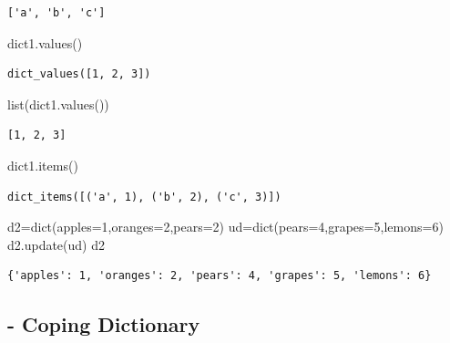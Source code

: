 \documentclass[
  letterpaper,
  DIV=11,
  numbers=noendperiod]{scrreprt}
\newenvironment{Shaded}{\begin{snugshade}}{\end{snugshade}}
\newcommand{\BuiltInTok}[1]{\textcolor[rgb]{0.00,0.23,0.31}{#1}}
\newcommand{\DecValTok}[1]{\textcolor[rgb]{0.68,0.00,0.00}{#1}}
\newcommand{\NormalTok}[1]{\textcolor[rgb]{0.00,0.23,0.31}{#1}}
\newcommand{\OperatorTok}[1]{\textcolor[rgb]{0.37,0.37,0.37}{#1}}
\begin{document}
\begin{verbatim}
['a', 'b', 'c']
\end{verbatim}

\begin{Shaded}
\begin{Highlighting}[]
\NormalTok{dict1.values()}
\end{Highlighting}
\end{Shaded}

\begin{verbatim}
dict_values([1, 2, 3])
\end{verbatim}

\begin{Shaded}
\begin{Highlighting}[]
\BuiltInTok{list}\NormalTok{(dict1.values())}
\end{Highlighting}
\end{Shaded}

\begin{verbatim}
[1, 2, 3]
\end{verbatim}

\begin{Shaded}
\begin{Highlighting}[]
\NormalTok{dict1.items()}
\end{Highlighting}
\end{Shaded}

\begin{verbatim}
dict_items([('a', 1), ('b', 2), ('c', 3)])
\end{verbatim}

\begin{Shaded}
\begin{Highlighting}[]
\NormalTok{d2}\OperatorTok{=}\BuiltInTok{dict}\NormalTok{(apples}\OperatorTok{=}\DecValTok{1}\NormalTok{,oranges}\OperatorTok{=}\DecValTok{2}\NormalTok{,pears}\OperatorTok{=}\DecValTok{2}\NormalTok{)}
\NormalTok{ud}\OperatorTok{=}\BuiltInTok{dict}\NormalTok{(pears}\OperatorTok{=}\DecValTok{4}\NormalTok{,grapes}\OperatorTok{=}\DecValTok{5}\NormalTok{,lemons}\OperatorTok{=}\DecValTok{6}\NormalTok{)}
\NormalTok{d2.update(ud)}
\NormalTok{d2}
\end{Highlighting}
\end{Shaded}

\begin{verbatim}
{'apples': 1, 'oranges': 2, 'pears': 4, 'grapes': 5, 'lemons': 6}
\end{verbatim}

\subsection{- Coping Dictionary}\label{coping-dictionary}
\end{document}
